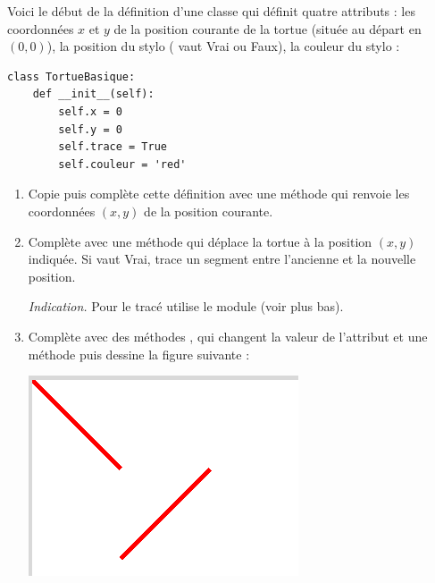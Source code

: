 \documentclass[11pt,class=report,crop=false]{standalone}
\begin{document}
\begin{activite}
	


Voici le début de la définition d'une classe  qui définit 
quatre attributs : les coordonnées $x$ et $y$ de la position courante de la tortue (située au départ en $(0,0)$), 
la position du stylo ( vaut \og{}Vrai\fg{} ou \og{}Faux\fg{}), la couleur du stylo :
\begin{lstlisting}
class TortueBasique:
    def __init__(self):
        self.x = 0
        self.y = 0
        self.trace = True
        self.couleur = 'red'
\end{lstlisting}



\begin{enumerate}
  \item Copie puis complète cette définition avec une méthode 
  qui renvoie les coordonnées $(x,y)$ de la position courante.
  
  \item Complète avec une méthode  qui
  déplace la tortue à la position $(x,y)$ indiquée.
  Si  vaut \og{}Vrai\fg{}, trace un segment entre l'ancienne et la nouvelle position.
  
  \emph{Indication.} Pour le tracé utilise le module  (voir plus bas).
  
  \item Complète avec des méthodes ,
   qui changent la valeur de l'attribut  et une méthode  puis dessine la figure suivante :

  
\begin{center}
\includegraphics[scale=\myscale,scale=0.4]{ecran-tortue-1}
\end{center}	  
  

\end{enumerate}
\end{activite}
\end{document}
